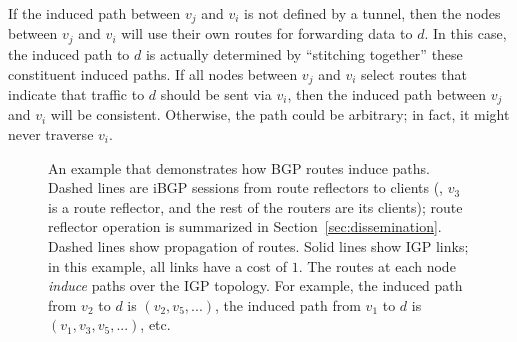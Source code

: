 If the induced path between $v_j$ and $v_i$ is not defined by a tunnel,
then the nodes between $v_j$ and $v_i$ will use their own routes for
forwarding data to $d$.  In this case, the induced path to $d$ is
actually determined by ``stitching together'' these constituent induced
paths.  If all nodes between $v_j$ and $v_i$ select routes that indicate
that traffic to $d$ should be sent via $v_i$, then the induced path
between $v_j$ and $v_i$ will be consistent.  Otherwise, the path could
be arbitrary; in fact, it might never traverse $v_i$.

\begin{figure}
\centering
\begin{psfrags}
%
\end{psfrags}
\caption[Paths and routes in BGP.]{An example that demonstrates how BGP
  routes induce paths.  Dashed lines are iBGP sessions from route
  reflectors to clients (\ie, $v_3$ is a route reflector, and the rest of
  the routers are its clients); route reflector operation is summarized
  in Section~\ref{sec:dissemination}.  Dashed lines show propagation of
  routes. Solid lines show IGP links; in this example, all links have a
  cost of $1$.  The routes at each node {\em induce} paths over the IGP
  topology. For example, the induced path from $v_2$ to $d$ is $(v_2,
  v_5, ...)$, the induced path from $v_1$ to $d$ is $(v_1, v_3, v_5,
  ...)$, etc.}
\label{fig:path_route}
\end{figure}

